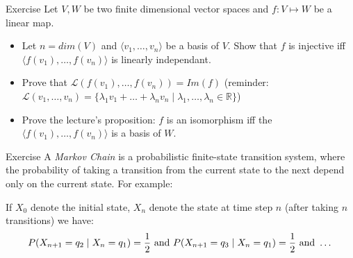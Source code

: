 \documentclass{beamer}
\begin{document}
  
\begin{frame}{Exercise}
  Let $V, W$ be two finite dimensional vector spaces and $f: V \mapsto W$ be a linear map.
  \begin{itemize}
  \item Let $n = dim(V)$ and $\langle v_1, \dots, v_n \rangle$ be a basis of $V$. Show that $f$ is injective iff $\langle f(v_1), \dots, f(v_n) \rangle$ is linearly independant.
  \item Prove that $\mathcal{L}(f(v_1), \dots, f(v_n)) = Im(f)$ (reminder: $\mathcal{L}(v_1, \dots, v_n) = \{\lambda_1 v_1 + \dots + \lambda_n v_n \mid \lambda_1, \dots, \lambda_n \in \mathbb{R}\}$)
  \item Prove the lecture's proposition: $f$ is an isomorphism iff the $\langle f(v_1), \dots, f(v_n) \rangle$ is a basis of $W$.
  \end{itemize}
\end{frame}


\begin{frame}{Exercise}
  A \emph{Markov Chain} is a probabilistic finite-state transition system, where the probability of taking a transition from the current state to the next depend only on the current state. For example:

  \begin{center}

    If $X_0$ denote the initial state, $X_n$ denote the state at time step $n$ (after taking $n$ transitions) we have:
    \[P(X_{n+1} = q_2 \mid X_n = q_1) = \frac{1}{2} \textnormal{ and } P(X_{n+1} = q_3 \mid X_n = q_1) = \frac{1}{2} \textnormal{ and } \dots\]
  \end{center}
  
\end{frame}
\end{document}
